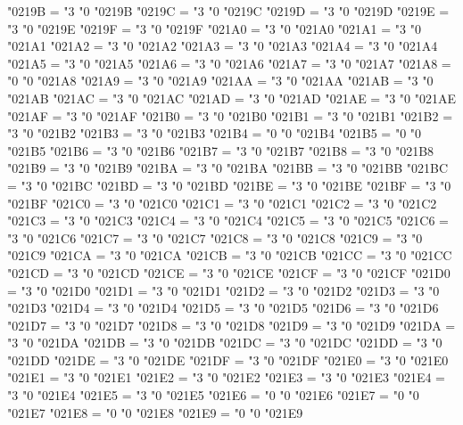 \Umathcode "0219B = "3 "0 "0219B
\Umathcode "0219C = "3 "0 "0219C
\Umathcode "0219D = "3 "0 "0219D
\Umathcode "0219E = "3 "0 "0219E
\Umathcode "0219F = "3 "0 "0219F
\Umathcode "021A0 = "3 "0 "021A0
\Umathcode "021A1 = "3 "0 "021A1
\Umathcode "021A2 = "3 "0 "021A2
\Umathcode "021A3 = "3 "0 "021A3
\Umathcode "021A4 = "3 "0 "021A4
\Umathcode "021A5 = "3 "0 "021A5
\Umathcode "021A6 = "3 "0 "021A6
\Umathcode "021A7 = "3 "0 "021A7
\Umathcode "021A8 = "0 "0 "021A8
\Umathcode "021A9 = "3 "0 "021A9
\Umathcode "021AA = "3 "0 "021AA
\Umathcode "021AB = "3 "0 "021AB
\Umathcode "021AC = "3 "0 "021AC
\Umathcode "021AD = "3 "0 "021AD
\Umathcode "021AE = "3 "0 "021AE
\Umathcode "021AF = "3 "0 "021AF
\Umathcode "021B0 = "3 "0 "021B0
\Umathcode "021B1 = "3 "0 "021B1
\Umathcode "021B2 = "3 "0 "021B2
\Umathcode "021B3 = "3 "0 "021B3
\Umathcode "021B4 = "0 "0 "021B4
\Umathcode "021B5 = "0 "0 "021B5
\Umathcode "021B6 = "3 "0 "021B6
\Umathcode "021B7 = "3 "0 "021B7
\Umathcode "021B8 = "3 "0 "021B8
\Umathcode "021B9 = "3 "0 "021B9
\Umathcode "021BA = "3 "0 "021BA
\Umathcode "021BB = "3 "0 "021BB
\Umathcode "021BC = "3 "0 "021BC
\Umathcode "021BD = "3 "0 "021BD
\Umathcode "021BE = "3 "0 "021BE
\Umathcode "021BF = "3 "0 "021BF
\Umathcode "021C0 = "3 "0 "021C0
\Umathcode "021C1 = "3 "0 "021C1
\Umathcode "021C2 = "3 "0 "021C2
\Umathcode "021C3 = "3 "0 "021C3
\Umathcode "021C4 = "3 "0 "021C4
\Umathcode "021C5 = "3 "0 "021C5
\Umathcode "021C6 = "3 "0 "021C6
\Umathcode "021C7 = "3 "0 "021C7
\Umathcode "021C8 = "3 "0 "021C8
\Umathcode "021C9 = "3 "0 "021C9
\Umathcode "021CA = "3 "0 "021CA
\Umathcode "021CB = "3 "0 "021CB
\Umathcode "021CC = "3 "0 "021CC
\Umathcode "021CD = "3 "0 "021CD
\Umathcode "021CE = "3 "0 "021CE
\Umathcode "021CF = "3 "0 "021CF
\Umathcode "021D0 = "3 "0 "021D0
\Umathcode "021D1 = "3 "0 "021D1
\Umathcode "021D2 = "3 "0 "021D2
\Umathcode "021D3 = "3 "0 "021D3
\Umathcode "021D4 = "3 "0 "021D4
\Umathcode "021D5 = "3 "0 "021D5
\Umathcode "021D6 = "3 "0 "021D6
\Umathcode "021D7 = "3 "0 "021D7
\Umathcode "021D8 = "3 "0 "021D8
\Umathcode "021D9 = "3 "0 "021D9
\Umathcode "021DA = "3 "0 "021DA
\Umathcode "021DB = "3 "0 "021DB
\Umathcode "021DC = "3 "0 "021DC
\Umathcode "021DD = "3 "0 "021DD
\Umathcode "021DE = "3 "0 "021DE
\Umathcode "021DF = "3 "0 "021DF
\Umathcode "021E0 = "3 "0 "021E0
\Umathcode "021E1 = "3 "0 "021E1
\Umathcode "021E2 = "3 "0 "021E2
\Umathcode "021E3 = "3 "0 "021E3
\Umathcode "021E4 = "3 "0 "021E4
\Umathcode "021E5 = "3 "0 "021E5
\Umathcode "021E6 = "0 "0 "021E6
\Umathcode "021E7 = "0 "0 "021E7
\Umathcode "021E8 = "0 "0 "021E8
\Umathcode "021E9 = "0 "0 "021E9
